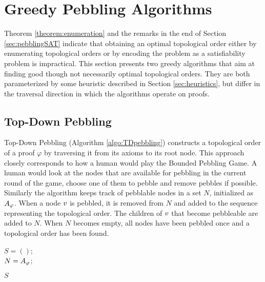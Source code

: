 \section{Greedy Pebbling Algorithms}
\label{sec:algorithms}

Theorem \ref{theorem:enumeration} and the remarks in the end of Section \ref{sec:pebblingSAT} indicate that obtaining an optimal topological order either by enumerating topological orders or by encoding the problem as a satisfiability problem is impractical. 
This section presents two greedy algorithms that aim at finding good though not necessarily optimal topological orders. 
They are both parameterized by some heuristic described in Section \ref{sec:heuristics}, but differ in the traversal direction in which the algorithms operate on proofs.

\subsection{Top-Down Pebbling}

Top-Down Pebbling (Algorithm \ref{algo:TDpebbling}) constructs a topological order of a proof $\varphi$ by traversing it from its axioms to its root node.
This approach closely corresponds to how a human would play the Bounded Pebbling Game. 
A human would look at the nodes that are available for pebbling in the current round of the game, choose one of them to pebble and remove pebbles if possible.
Similarly the algorithm keeps track of pebblable nodes in a set $N$, initialized as $A_{\varphi}$.
When a node $v$ is pebbled, it is removed from $N$ and added to the sequence representing the topological order. The children of $v$ that become pebbleable are added to $N$.
When $N$ becomes empty, all nodes have been pebbled once and a topological order has been found.


\begin{algorithm}[h]
	
	$S = ()$;  \\
	$N = A_{\varphi}$; 
	
	
	\Return $S$\;
	
  \caption[.]{}
  \label{algo:TDpebbling}
\end{algorithm}

